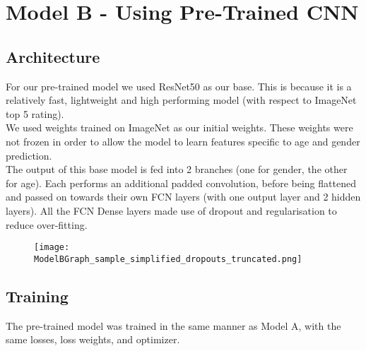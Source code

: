
\section{Model B - Using Pre-Trained CNN}
\subsection{Architecture}
For our pre-trained model we used ResNet50 as our base. This is because it is a relatively fast, lightweight and high performing model (with respect to ImageNet top 5 rating).\\
We used weights trained on ImageNet as our initial weights.
These weights were not frozen in order to allow the model to learn features specific to age and gender prediction.\\
The output of this base model is fed into 2 branches (one for gender, the other for age).
Each performs an additional padded convolution, before being flattened and passed on towards their own FCN layers (with one output layer and 2 hidden layers).
All the FCN Dense layers made use of dropout and regularisation to reduce over-fitting.
\begin{figure}[h]
    \centering
    \texttt{[image: ModelBGraph\_sample\_simplified\_dropouts\_truncated.png]}
\end{figure}

\subsection{Training}
The pre-trained model was trained in the same manner as Model A, with the same losses, loss weights, and optimizer. 

